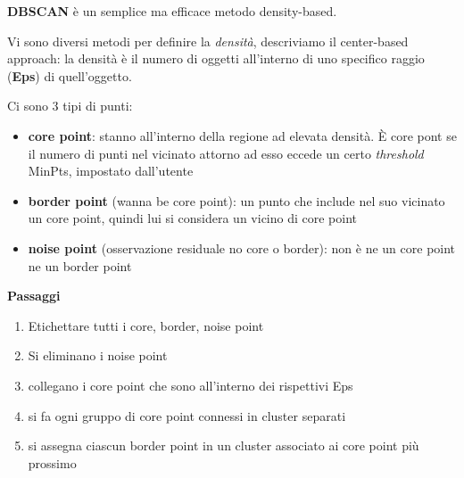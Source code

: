 \textbf{DBSCAN} \`e un semplice ma efficace metodo density-based. 

Vi sono diversi metodi per definire la \textit{densit\`a}, descriviamo il center-based approach: la densit\`a \`e il numero di oggetti all'interno di uno specifico raggio (\textbf{Eps}) di quell'oggetto. 

\noindent
Ci sono 3 tipi di punti:
\begin{itemize}
	\item \textbf{core point}: stanno all'interno della regione ad elevata densit\`a. \`E core pont se il numero di punti nel vicinato attorno ad esso eccede un certo \textit{threshold} MinPts, impostato dall'utente
	\item \textbf{border point} (wanna be core point): un punto che include nel suo vicinato un core point, quindi lui si considera un vicino di core point
	\item \textbf{noise point} (osservazione residuale no core o border): non \`e ne un core point ne un border point
\end{itemize}

\noindent
\textbf{Passaggi}
\begin{enumerate}
	\item Etichettare tutti i core, border, noise point
	\item Si eliminano i noise point
	\item collegano i core point che sono all'interno dei rispettivi Eps
	\item si fa ogni gruppo di core point connessi in cluster separati
	\item si assegna ciascun border point in un cluster associato ai core point pi\`u prossimo
\end{enumerate}

